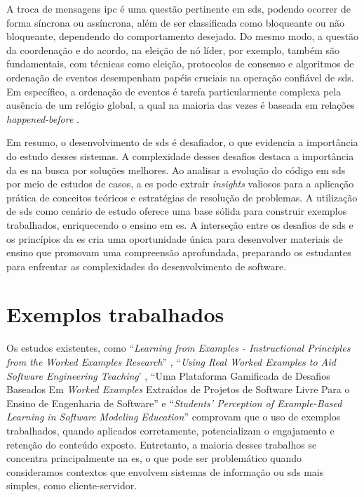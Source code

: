 A troca de mensagens \gls{ipc} é uma questão pertinente em \gls{sds}, podendo ocorrer de forma síncrona ou assíncrona, além de ser classificada como bloqueante ou não bloqueante, dependendo do comportamento desejado. Do mesmo modo, a questão da coordenação e do acordo, na eleição de nó líder, por exemplo, também são fundamentais, com técnicas como eleição, protocolos de consenso e algoritmos de ordenação de eventos desempenham papéis cruciais na operação confiável de \gls{sds}. Em específico, a ordenação de eventos é tarefa particularmente complexa pela ausência de um relógio global, a qual na maioria das vezes é baseada em relações \textit{happened-before} \cite{DistributedSystemsCoulouris}.

Em resumo, o desenvolvimento de \gls{sds} é desafiador, o que evidencia a importância do estudo desses sistemas. A complexidade desses desafios destaca a importância da \gls{es} na busca por soluções melhores. Ao analisar a evolução do código em \gls{sds} por meio de estudos de casos, a \gls{es} pode extrair \textit{insights} valiosos para a aplicação prática de conceitos teóricos e estratégias de resolução de problemas. A utilização de \gls{sds} como cenário de estudo oferece uma base sólida para construir exemplos trabalhados, enriquecendo o ensino em \gls{es}. A interseção entre os desafios de \gls{sds} e os princípios da \gls{es} cria uma oportunidade única para desenvolver materiais de ensino que promovam uma compreensão aprofundada, preparando os estudantes para enfrentar as complexidades do desenvolvimento de software.

\section{Exemplos trabalhados}

Os estudos existentes, como ``\textit{Learning from Examples - Instructional Principles from the Worked Examples Research}'' \cite{Robert.Atkinson-etal:2000}, ``\textit{Using Real Worked Examples to Aid Software Engineering Teaching}' \cite{Simone.Tonhao-etal:2021}, ``Uma Plataforma Gamificada de Desafios Baseados Em \textit{Worked Examples} Extraídos de Projetos de Software Livre Para o Ensino de Engenharia de Software'' \cite{Simone.Tonhao-etal:2022} e ``\textit{Students' Perception of Example-Based Learning in Software Modeling Education}'' \cite{Tiago.Bonetti-etal:2023} comprovam que o uso de exemplos trabalhados, quando aplicados corretamente, potencializam o engajamento e retenção do conteúdo exposto. Entretanto, a maioria desses trabalhos se concentra principalmente na \gls{es}, o que pode ser problemático quando consideramos contextos que envolvem sistemas de informação ou \gls{sds} mais simples, como cliente-servidor. 

